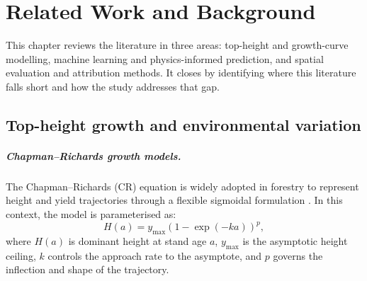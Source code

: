 \newcommand{\fc}[1]{\textcolor{red}{[FactC: #1]}}
\newcommand{\ct}[1]{\textcolor{orange}{[CITE: #1]}}
\newcommand{\app}[1]{\textcolor{blue}{[APP: #1]}}
\newcommand{\sr}[1]{\textcolor{teal}{[Sreword: #1]}}
\newcommand{\fig}[1]{\textcolor{purple}{[FIG: #1]}}
\newcommand{\ai}[1]{\textcolor{brown}{[AI: #1]}}


\chapter{Related Work and Background}
\label{ch:background}

This chapter reviews the literature in three areas: top-height and growth-curve modelling, machine learning and physics-informed prediction, and spatial evaluation and attribution methods. It closes by identifying where this literature falls short and how the study addresses that gap.


\section{Top-height growth and environmental variation}
\label{sec:background-top-height}

\paragraph*{Chapman--Richards growth models.}
The Chapman--Richards (CR) equation is widely adopted in forestry to represent height and yield trajectories through a flexible sigmoidal formulation \citep{richards1959Flexible_C2_CR,pommerening2015Methods_C2_CR,manso2021Dynamic_C2_CR}. In this context, the model is parameterised as:
\begin{equation}
H(a) = y_{\max}\left(1-\exp(-ka)\right)^p,
\label{eq:background-cr}
\end{equation}
where $H(a)$ is dominant height at stand age $a$, $y_{\max}$ is the asymptotic height ceiling, $k$ controls the approach rate to the asymptote, and $p$ governs the inflection and shape of the trajectory.

